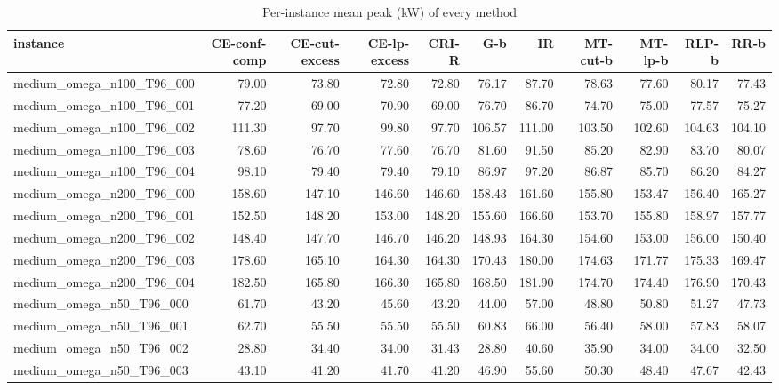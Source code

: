 \begin{table}[htbp]
\centering
\small
\caption{Per-instance mean peak (kW) of every method}
\label{tab:E2b_head_to_head_budgets_b1_per_instance}
\begin{tabular}{lrrrrrrrrrr}
\toprule
instance & CE-conf-comp & CE-cut-excess & CE-lp-excess & CRI-R & G-b & IR & MT-cut-b & MT-lp-b & RLP-b & RR-b \\
\midrule
medium\_omega\_n100\_T96\_000 & 79.00 & 73.80 & 72.80 & 72.80 & 76.17 & 87.70 & 78.63 & 77.60 & 80.17 & 77.43 \\
medium\_omega\_n100\_T96\_001 & 77.20 & 69.00 & 70.90 & 69.00 & 76.70 & 86.70 & 74.70 & 75.00 & 77.57 & 75.27 \\
medium\_omega\_n100\_T96\_002 & 111.30 & 97.70 & 99.80 & 97.70 & 106.57 & 111.00 & 103.50 & 102.60 & 104.63 & 104.10 \\
medium\_omega\_n100\_T96\_003 & 78.60 & 76.70 & 77.60 & 76.70 & 81.60 & 91.50 & 85.20 & 82.90 & 83.70 & 80.07 \\
medium\_omega\_n100\_T96\_004 & 98.10 & 79.40 & 79.40 & 79.10 & 86.97 & 97.20 & 86.87 & 85.70 & 86.20 & 84.27 \\
medium\_omega\_n200\_T96\_000 & 158.60 & 147.10 & 146.60 & 146.60 & 158.43 & 161.60 & 155.80 & 153.47 & 156.40 & 165.27 \\
medium\_omega\_n200\_T96\_001 & 152.50 & 148.20 & 153.00 & 148.20 & 155.60 & 166.60 & 153.70 & 155.80 & 158.97 & 157.77 \\
medium\_omega\_n200\_T96\_002 & 148.40 & 147.70 & 146.70 & 146.20 & 148.93 & 164.30 & 154.60 & 153.00 & 156.00 & 150.40 \\
medium\_omega\_n200\_T96\_003 & 178.60 & 165.10 & 164.30 & 164.30 & 170.43 & 180.00 & 174.63 & 171.77 & 175.33 & 169.47 \\
medium\_omega\_n200\_T96\_004 & 182.50 & 165.80 & 166.30 & 165.80 & 168.50 & 181.90 & 174.70 & 174.40 & 176.90 & 170.43 \\
medium\_omega\_n50\_T96\_000 & 61.70 & 43.20 & 45.60 & 43.20 & 44.00 & 57.00 & 48.80 & 50.80 & 51.27 & 47.73 \\
medium\_omega\_n50\_T96\_001 & 62.70 & 55.50 & 55.50 & 55.50 & 60.83 & 66.00 & 56.40 & 58.00 & 57.83 & 58.07 \\
medium\_omega\_n50\_T96\_002 & 28.80 & 34.40 & 34.00 & 31.43 & 28.80 & 40.60 & 35.90 & 34.00 & 34.00 & 32.50 \\
medium\_omega\_n50\_T96\_003 & 43.10 & 41.20 & 41.70 & 41.20 & 46.90 & 55.60 & 50.30 & 48.40 & 47.67 & 42.43 \\

\end{tabular}
\end{table}

